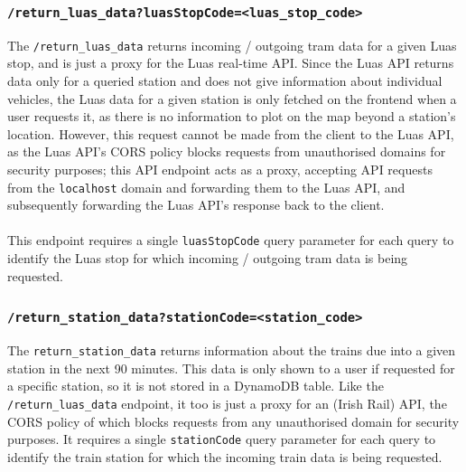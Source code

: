 \documentclass[a4paper,11pt]{report}
\begin{document}
\subsubsection{\texttt{/return\_luas\_data?luasStopCode=<luas\_stop\_code>}}
The \verb|/return_luas_data| returns incoming / outgoing tram data for a given Luas stop, and is just a proxy for the Luas real-time API.
Since the Luas API returns data only for a queried station and does not give information about individual vehicles, the Luas data for a given station is only fetched on the frontend when a user requests it, as there is no information to plot on the map beyond a station's location.
However, this request cannot be made from the client to the Luas API, as the Luas API's CORS policy blocks requests from unauthorised domains for security purposes;
this API endpoint acts as a proxy, accepting API requests from the \verb|localhost| domain and forwarding them to the Luas API, and subsequently forwarding the Luas API's response back to the client.
\\\\
This endpoint requires a single \verb|luasStopCode| query parameter for each query to identify the Luas stop for which incoming / outgoing tram data is being requested.

\subsubsection{\texttt{/return\_station\_data?stationCode=<station\_code>}}
The \verb|return_station_data| returns information about the trains due into a given station in the next 90 minutes.
This data is only shown to a user if requested for a specific station, so it is not stored in a DynamoDB table.
Like the \verb|/return_luas_data| endpoint, it too is just a proxy for an (Irish Rail) API, the CORS policy of which blocks requests from any unauthorised domain for security purposes.
It requires a single \verb|stationCode| query parameter for each query to identify the train station for which the incoming train data is being requested.

\end{document}
